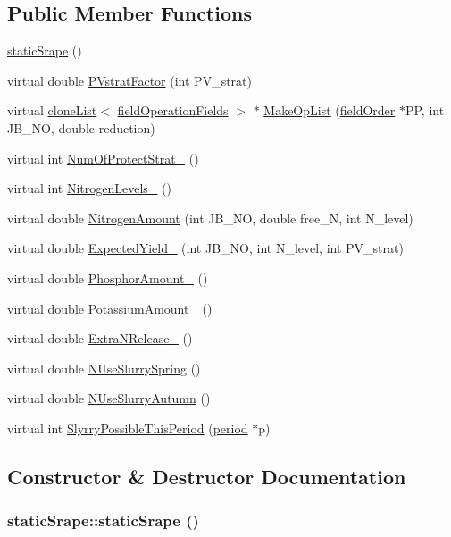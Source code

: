 \subsection*{Public Member Functions}
\begin{DoxyCompactItemize}
\item 
\hyperlink{classstatic_srape_aec558a61ead1bcb6b944149fe07c3f29}{staticSrape} ()
\item 
virtual double \hyperlink{classstatic_srape_a30c92b0c5720bfdaf6c52bbb6648ca2f}{PVstratFactor} (int PV\_\-strat)
\item 
virtual \hyperlink{classclone_list}{cloneList}$<$ \hyperlink{classfield_operation_fields}{fieldOperationFields} $>$ $\ast$ \hyperlink{classstatic_srape_a7db3ea6c58117111c9d21a07a6b83a00}{MakeOpList} (\hyperlink{classfield_order}{fieldOrder} $\ast$PP, int JB\_\-NO, double reduction)
\item 
virtual int \hyperlink{classstatic_srape_a9e7908806107ebe3c9e2d48bfa141740}{NumOfProtectStrat\_\-} ()
\item 
virtual int \hyperlink{classstatic_srape_ae0044ad5311c8ba1baf926ff76bb250d}{NitrogenLevels\_\-} ()
\item 
virtual double \hyperlink{classstatic_srape_ab7b04b4747f7bb609d41f76d578e2d45}{NitrogenAmount} (int JB\_\-NO, double free\_\-N, int N\_\-level)
\item 
virtual double \hyperlink{classstatic_srape_af0a091d0bfdacd5ff9dafb1a4f3fa062}{ExpectedYield\_\-} (int JB\_\-NO, int N\_\-level, int PV\_\-strat)
\item 
virtual double \hyperlink{classstatic_srape_ad364cf81c5e8888cd2c7efcf32a18d49}{PhosphorAmount\_\-} ()
\item 
virtual double \hyperlink{classstatic_srape_a277f6842674f253537e81c07e60f5cc6}{PotassiumAmount\_\-} ()
\item 
virtual double \hyperlink{classstatic_srape_a2fbf9178adfebf89d2699559a9b7fd42}{ExtraNRelease\_\-} ()
\item 
virtual double \hyperlink{classstatic_srape_a1f6da756880c654f33ca67d83aea2a3a}{NUseSlurrySpring} ()
\item 
virtual double \hyperlink{classstatic_srape_ac2055f4e715fd46e0334b739cadbe538}{NUseSlurryAutumn} ()
\item 
virtual int \hyperlink{classstatic_srape_a1af4f87d4fb9f95534a1c9ca78e4c523}{SlyrryPossibleThisPeriod} (\hyperlink{classperiod}{period} $\ast$p)
\end{DoxyCompactItemize}


\subsection{Constructor \& Destructor Documentation}
\hypertarget{classstatic_srape_aec558a61ead1bcb6b944149fe07c3f29}{
\subsubsection[{staticSrape}]{\setlength{\rightskip}{0pt plus 5cm}staticSrape::staticSrape ()}}
\label{classstatic_srape_aec558a61ead1bcb6b944149fe07c3f29}


